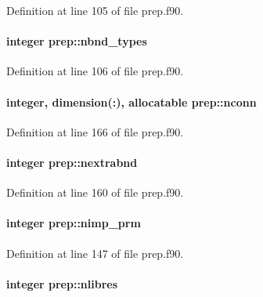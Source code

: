 Definition at line 105 of file prep.\-f90.

\hypertarget{classprep_a2308de44ae31622b6609e54cd66291da}{
\paragraph[{nbnd\-\_\-types}]{\setlength{\rightskip}{0pt plus 5cm}integer prep\-::nbnd\-\_\-types}}\label{classprep_a2308de44ae31622b6609e54cd66291da}


Definition at line 106 of file prep.\-f90.

\hypertarget{classprep_a61e6a6610a60fcf8e557aeeb68215ccb}{
\paragraph[{nconn}]{\setlength{\rightskip}{0pt plus 5cm}integer, dimension(\-:), allocatable prep\-::nconn}}\label{classprep_a61e6a6610a60fcf8e557aeeb68215ccb}


Definition at line 166 of file prep.\-f90.

\hypertarget{classprep_a43c4ae861ddacd4228d5cbbb31ceed7a}{
\paragraph[{nextrabnd}]{\setlength{\rightskip}{0pt plus 5cm}integer prep\-::nextrabnd}}\label{classprep_a43c4ae861ddacd4228d5cbbb31ceed7a}


Definition at line 160 of file prep.\-f90.

\hypertarget{classprep_a131a8dff6c39bd140e35d19b2ee9558c}{
\paragraph[{nimp\-\_\-prm}]{\setlength{\rightskip}{0pt plus 5cm}integer prep\-::nimp\-\_\-prm}}\label{classprep_a131a8dff6c39bd140e35d19b2ee9558c}


Definition at line 147 of file prep.\-f90.

\hypertarget{classprep_a45b6e35c6833923457375f4d56f0f5b5}{
\paragraph[{nlibres}]{\setlength{\rightskip}{0pt plus 5cm}integer prep\-::nlibres}}\label{classprep_a45b6e35c6833923457375f4d56f0f5b5}


